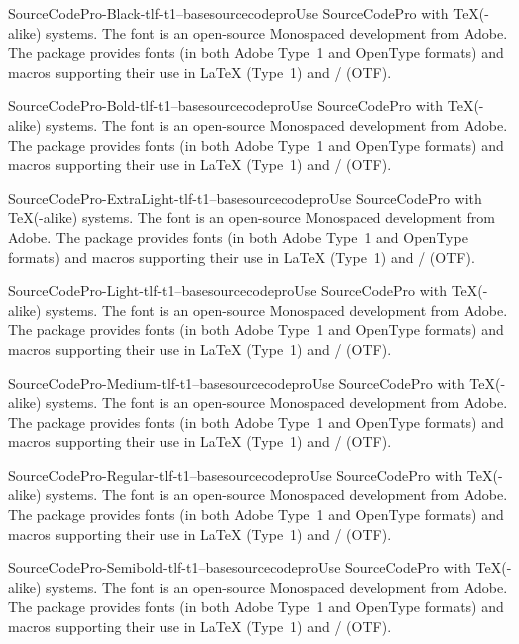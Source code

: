 \documentclass{ddltxtyp}
\begin{document}
\begin{package}{SourceCodePro-Black-tlf-t1--base}{sourcecodepro}{Use SourceCodePro with {\TeX}(-alike) systems.}
The font is an open-source Monospaced development from Adobe.
The package provides fonts (in both Adobe Type~1 and OpenType
formats) and macros supporting their use in {\LaTeX} (Type~1) and
{\XeLaTeX}/{\LuaLaTeX} (OTF).
\end{package}
\begin{package}{SourceCodePro-Bold-tlf-t1--base}{sourcecodepro}{Use SourceCodePro with {\TeX}(-alike) systems.}
The font is an open-source Monospaced development from Adobe.
The package provides fonts (in both Adobe Type~1 and OpenType
formats) and macros supporting their use in {\LaTeX} (Type~1) and
{\XeLaTeX}/{\LuaLaTeX} (OTF).
\end{package}
\begin{package}{SourceCodePro-ExtraLight-tlf-t1--base}{sourcecodepro}{Use SourceCodePro with {\TeX}(-alike) systems.}
The font is an open-source Monospaced development from Adobe.
The package provides fonts (in both Adobe Type~1 and OpenType
formats) and macros supporting their use in {\LaTeX} (Type~1) and
{\XeLaTeX}/{\LuaLaTeX} (OTF).
\end{package}
\begin{package}{SourceCodePro-Light-tlf-t1--base}{sourcecodepro}{Use SourceCodePro with {\TeX}(-alike) systems.}
The font is an open-source Monospaced development from Adobe.
The package provides fonts (in both Adobe Type~1 and OpenType
formats) and macros supporting their use in {\LaTeX} (Type~1) and
{\XeLaTeX}/{\LuaLaTeX} (OTF).
\end{package}
\begin{package}{SourceCodePro-Medium-tlf-t1--base}{sourcecodepro}{Use SourceCodePro with {\TeX}(-alike) systems.}
The font is an open-source Monospaced development from Adobe.
The package provides fonts (in both Adobe Type~1 and OpenType
formats) and macros supporting their use in {\LaTeX} (Type~1) and
{\XeLaTeX}/{\LuaLaTeX} (OTF).
\end{package}
\begin{package}{SourceCodePro-Regular-tlf-t1--base}{sourcecodepro}{Use SourceCodePro with {\TeX}(-alike) systems.}
The font is an open-source Monospaced development from Adobe.
The package provides fonts (in both Adobe Type~1 and OpenType
formats) and macros supporting their use in {\LaTeX} (Type~1) and
{\XeLaTeX}/{\LuaLaTeX} (OTF).
\end{package}
\begin{package}{SourceCodePro-Semibold-tlf-t1--base}{sourcecodepro}{Use SourceCodePro with {\TeX}(-alike) systems.}
The font is an open-source Monospaced development from Adobe.
The package provides fonts (in both Adobe Type~1 and OpenType
formats) and macros supporting their use in {\LaTeX} (Type~1) and
{\XeLaTeX}/{\LuaLaTeX} (OTF).
\end{package}
\end{document}
